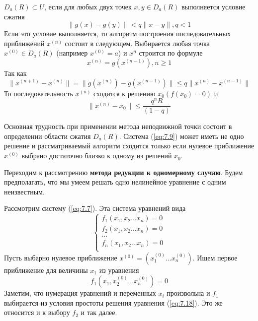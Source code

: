 $D_a(R) \subset U$, если для любых двух точек $x, y \in D_a(R)$ выполняется условие сжатия
\begin{equation} \label{eq:7.13}
	\|g(x) - g(y)\| < q\|x - y\|, q < 1
\end{equation}
Если это условие выполняется, то алгоритм построения последовательных приближений $x^{(n)}$ состоит в следующем. Выбирается любая точка $x^{(0)} \in D_a(R)$ (например $x^{(0)} = a$) и $x^{{n}}$ строится по формуле
\begin{equation} \label{eq:7.14}
	x^{(n)} = g(x^{(n-1)}), n \geq 1
\end{equation}
Так как
\begin{equation} \label{eq:7.15}
	\|x^{(n+1)} - x^{(n)}\| = \|g(x^{(n)}) - g(x^{(n-1)})\| \leq q\|x^{(n)} - x^{(n-1)}\|
\end{equation}
То последовательность $x^{(n)}$ сходится к решению $x_0 (f(x_0) = 0)$ и 
\begin{equation} \label{eq:7.16}
	\|x^{(n)} - x_0\| \leq \frac{q^nR}{(1-q)}
\end{equation}


Основная трудность при применении метода неподвижной точки состоит в определении области сжатия $D_a(R)$. Система (\ref{eq:7.9}) может иметь не одно решение и рассматриваемый алгоритм сходится только если нулевое приближение $x^{(0)}$ выбрано достаточно близко к одному из решений $x_0$.

Переходим к рассмотрению \textbf{метода редукции к одномерному случаю}. Будем предполагать, что мы умеем решать одно нелинейное уравнение с одним неизвестным.

Рассмотрим систему (\ref{eq:7.7}). Эта система уравнений вида
\begin{equation} \label{eq:7.17}
	\begin{cases} 
		f_1(x_1, x_2 \dots x_n) = 0 \\
		f_2(x_1, x_2 \dots x_n) = 0 \\
		\dots \\
		f_n(x_1, x_2 \dots x_n) = 0 \\
	\end{cases}
\end{equation}
Пусть выбарно нулевое приближение $x^{(0)} = (x_1^{(0)} \dots x_n^{(0)})$. Ищем первое приближение для величины $x_1$ из уравнения
\begin{equation} \label{eq:7.18}
	f_1(x_1, x_2^{(0)} \dots x_n^{(0)}) = 0
\end{equation}
Заметим, что нумерация уравнений и переменных $x_i$ произвольна и $f_1$ выбирается из условия простоты решения уравнения (\ref{eq:7.18}). Это же относится и к выбору $f_2$ и так далее.

